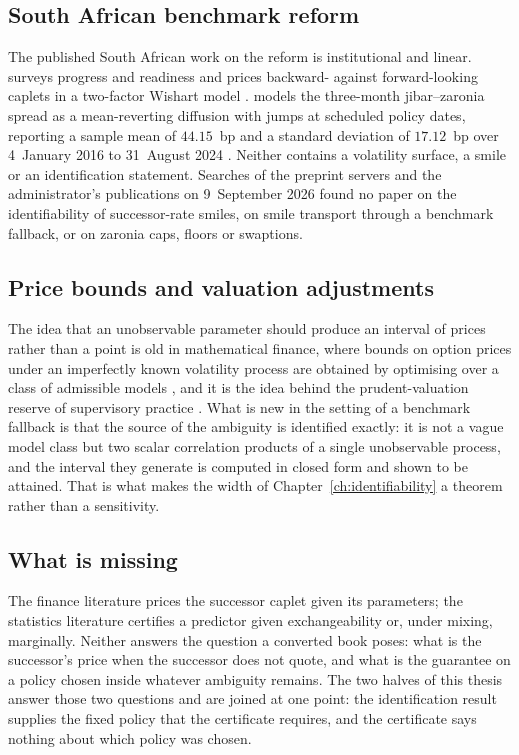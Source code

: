 \documentclass[../../../main.tex]{subfiles}
\begin{document}
\subsection{South African benchmark reform}

The published South African work on the reform is institutional and linear. \citet{alfeus2024} surveys progress and readiness and prices backward- against forward-looking caplets in a two-factor Wishart model \citep[Table~2]{alfeus2024}. \citet{alfeus2026} models the three-month \gls{jibar}--\gls{zaronia} spread as a mean-reverting diffusion with jumps at scheduled policy dates, reporting a sample mean of $44.15$~bp and a standard deviation of $17.12$~bp over 4~January 2016 to 31~August 2024 \citep[Sec.~3]{alfeus2026}. Neither contains a volatility surface, a smile or an identification statement. Searches of the preprint servers and the administrator's publications on 9~September 2026 found no paper on the identifiability of successor-rate smiles, on smile transport through a benchmark fallback, or on \gls{zaronia} caps, floors or swaptions.

\subsection{Price bounds and valuation adjustments}

The idea that an unobservable parameter should produce an interval of prices rather than a point is old in mathematical finance, where bounds on option prices under an imperfectly known volatility process are obtained by optimising over a class of admissible models \citep{frey1999}, and it is the idea behind the prudent-valuation reserve of supervisory practice \citep{bcbs2019}. What is new in the setting of a benchmark fallback is that the source of the ambiguity is identified exactly: it is not a vague model class but two scalar correlation products of a single unobservable process, and the interval they generate is computed in closed form and shown to be attained. That is what makes the width of Chapter~\ref{ch:identifiability} a theorem rather than a sensitivity.

\subsection{What is missing}

The finance literature prices the successor caplet given its parameters; the statistics literature certifies a predictor given exchangeability or, under mixing, marginally. Neither answers the question a converted book poses: what is the successor's price when the successor does not quote, and what is the guarantee on a policy chosen inside whatever ambiguity remains. The two halves of this thesis answer those two questions and are joined at one point: the identification result supplies the fixed policy that the certificate requires, and the certificate says nothing about which policy was chosen.
\end{document}
